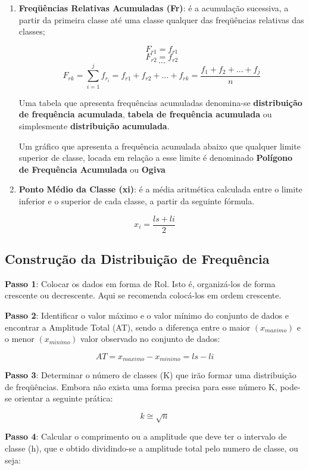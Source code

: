 \begin{enumerate}
\item \textbf{Freqüências Relativas Acumuladas (Fr)}: é a acumulação sucessiva, a partir da primeira classe até uma classe qualquer das freqüências relativas das classes;

    $$ F_{r1}=f_{r1} $$
    $$ F_{r2}=f_{r2} $$
    $$   \ldots  $$
    $$ F_{rk}=  \sum_{i=1}^{j}f_{r_{i}}  = f_{r1}+f_{r2}+\ldots+ f_{rk}= \frac{f_{1}+f_{2}+\ldots+f_{j}}{n}$$

Uma tabela que apresenta frequências acumuladas denomina-se \textbf{distribuição de frequência acumulada}, \textbf{tabela de frequência acumulada} ou simplesmente \textbf{distribuição acumulada}.\vskip0.3cm

Um gráfico que apresenta a frequência acumulada abaixo que qualquer limite superior de classe, locada em relação a esse limite é denominado \textbf{Polígono de Frequência Acumulada} ou \textbf{Ogiva}




    \item \textbf{Ponto Médio da Classe (xi)}: é a média aritmética calculada entre o limite inferior e o superior de cada classe, a partir da seguinte fórmula.
\end{enumerate}


$$ x_{i}=\frac{ls+li}{2} $$


\subsection{Construção da Distribuição de Frequência}

\inic \textbf{Passo 1}: Colocar os dados em forma de Rol. Isto é, organizá-los de forma crescente ou decrescente. Aqui se recomenda colocá-los em ordem crescente.\vskip0.3cm

\textbf{Passo 2}: Identificar o valor máximo e o valor mínimo do conjunto de dados e encontrar a Amplitude Total (AT), sendo a diferença entre o maior $(x_{maximo})$ e o menor $(x_{minimo})$  valor observado no conjunto de dados:

$$ AT= x_{maximo}- x_{minimo} = ls - li$$

\textbf{Passo 3}: Determinar o número de classes (K) que irão formar uma distribuição de freqüências. Embora não exista uma forma precisa para esse número K, pode-se orientar a seguinte prática:


$$ k \cong \sqrt{n}$$


\textbf{Passo 4}: Calcular o comprimento ou a amplitude que deve ter o intervalo de classe (h), que e obtido dividindo-se a amplitude total pelo numero de classe, ou seja:


